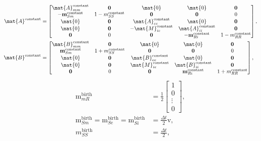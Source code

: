 \documentclass{jpmarticle}
\renewcommand{\vec}[1]{\boldsymbol{\mathrm{#1}}}
\begin{document}
\begin{equation}
  \begin{split}
    \mat{A}^{\text{constant}} &=
    \begin{bmatrix}
      \mat{A}_{mm}^{\text{constant}} & \vec{0} & \mat{0} & \mat{0} & \vec{0}
      \\
      - \vec{m}_{Sm}^{\text{constant}} & 1 - m_{SS}^{\text{constant}} &
      \vec{0} & \vec{0} & 0
      \\
      \mat{0} & \vec{0} & \mat{A}_{ee}^{\text{constant}} & \mat{0} & \vec{0}
      \\
      \mat{0} & \vec{0} & - \mat{M}_{ie}^{\text{constant}} &
      \mat{A}_{ii}^{\text{constant}} & \vec{0}
      \\
      \vec{0} & 0 & \vec{0} & - \vec{m}_{Ri}^{\text{constant}} &
      1 - m_{RR}^{\text{constant}}
    \end{bmatrix},
    \\
    \mat{B}^{\text{constant}} &=
    \begin{bmatrix}
      \mat{B}_{mm}^{\text{constant}} & \vec{0} & \mat{0} & \mat{0} & \vec{0}
      \\
      \vec{m}_{Sm}^{\text{constant}} & 1 + m_{SS}^{\text{constant}} &
      \vec{0} & \vec{0} & 0
      \\
      \mat{0} & \vec{0} & \mat{B}_{ee}^{\text{constant}} & \mat{0} & \vec{0}
      \\
      \mat{0} & \vec{0} & \mat{M}_{ie}^{\text{constant}} &
      \mat{B}_{ii}^{\text{constant}} & \vec{0}
      \\
      \vec{0} & 0 & \vec{0} & \vec{m}_{Ri}^{\text{constant}} &
      1 + m_{RR}^{\text{constant}}
    \end{bmatrix},
  \end{split}
\end{equation}
\begin{equation}
  \begin{split}
    \vec{m}_{mR}^{\text{birth}} &=
    \frac{1}{2}
    \begin{bmatrix}
      1 \\ 0 \\ \vdots \\ 0
    \end{bmatrix},
    \\
    \vec{m}_{Sm}^{\text{birth}} =
    \vec{m}_{Se}^{\text{birth}} =
    \vec{m}_{Si}^{\text{birth}} &=
    \frac{\Delta t}{2} \vec{v},
    \\
    m_{SS}^{\text{birth}} &=
    \frac{\Delta t}{2},
  \end{split}
\end{equation}
\end{document}
